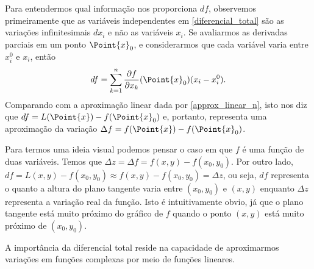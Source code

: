 Para entendermos qual informação nos proporciona $df$, observemos primeiramente que as variáveis independentes em \eqref{diferencial_total} são as variações infinitesimais $dx_i$ e não as variáveis $x_i$. Se avaliarmos as derivadas parciais em um ponto $\Point{x}_0$, e considerarmos que cada variável varia entre $x_i^0$ e $x_i$, então
$$df=\sum_{k=1}^n \dfrac{\partial f}{\partial x_k}(\Point{x}_0) (x_i-x_i^0).$$
Comparando com a aproximação linear dada por \eqref{approx_linear_n}, isto nos diz que $df=L(\Point{x})-f(\Point{x}_0)$ e, portanto, representa uma aproximação da variação $\Delta f = f(\Point{x})-f(\Point{x}_0)$. 

Para termos uma ideia visual podemos pensar o caso em que $f$ é uma função de duas variáveis. Temos que $\Delta z = \Delta f= f(x,y)-f(x_0,y_0)$. Por outro lado, 
$df=L(x,y)-f(x_0,y_0)\approx f(x,y)-f(x_0,y_0) = \Delta z$,
ou seja, $df$ representa o quanto a altura do plano tangente varia entre $(x_0,y_0)$ e $(x,y)$ enquanto $\Delta z$ representa a variação real da função. Isto é intuitivamente obvio, já que o plano tangente está muito próximo do gráfico de $f$ quando o ponto $(x,y)$ está muito próximo de $(x_0,y_0)$. 

A importância da diferencial total reside na capacidade de aproximarmos variações em funções complexas por meio de funções lineares.

\begin{comment}
\begin{example}{}{}
Suponha que a função de demanda para um produto seja dada por:
\[D(p, I) = 100 - 2p + 0.5I\]
onde \(D\) é a quantidade demandada, \(p\) é o preço do produto e \(I\) é a renda dos consumidores. Podemos calcular as derivadas parciais dessa função:
\[\frac{\partial D}{\partial p} = -2\]
\[\frac{\partial D}{\partial I} = 0.5\]

Agora, usando a diferencial total, podemos analisar como a demanda muda quando o preço e a renda mudam. Por exemplo, se o preço (\(p\)) aumentar em 1 e a renda (\(I\)) aumentar em 100, podemos calcular a variação na demanda:
\[dD = \frac{\partial D}{\partial p} dp + \frac{\partial D}{\partial I} dI
= (-2) \cdot 1 + (0.5) \cdot 100
 = -2 + 50
= 48.\]

Isso significa que, de acordo com essa função de demanda, um aumento de 1 no preço e um aumento de 100 na renda levarão a um aumento de 48 unidades na quantidade demandada.

\end{example}
\end{comment}

